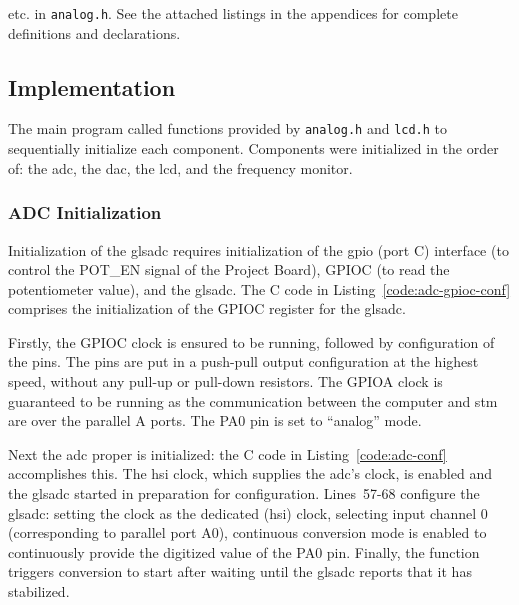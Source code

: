 etc. in \lstinline{analog.h}. See the attached listings in the
appendices for complete definitions and declarations.

\subsection{Implementation}
The main program called functions provided by \lstinline{analog.h} and
\lstinline{lcd.h} to sequentially initialize each component. Components
were initialized in the order of: the \gls{adc}, the \gls{dac}, the
\gls{lcd}, and the frequency monitor. 


\subsubsection{ADC Initialization}
Initialization of the gls{adc} requires initialization of the \gls{gpio}
(port C) interface (to control the POT\_EN signal of the Project Board),
GPIOC (to read the potentiometer value), and the gls{adc}. The C code in
Listing~\ref{code:adc-gpioc-conf} comprises the initialization of the
GPIOC register for the gls{adc}.


Firstly, the GPIOC clock is ensured to be running, followed by
configuration of the pins. The pins are put in a push-pull output
configuration at the highest speed, without any pull-up or pull-down
resistors. The GPIOA clock is guaranteed to be running as the
communication between the computer and \gls{stm} are over the parallel
A ports. The PA0 pin is set to ``analog'' mode. \\


Next the \gls{adc} proper is initialized: the C code in
Listing~\ref{code:adc-conf} accomplishes this.  The \gls{hsi} clock, which
supplies the \gls{adc}'s clock, is enabled and the gls{adc} started in preparation
for configuration. Lines~57-68 configure the gls{adc}: setting the clock as
the dedicated (\gls{hsi}) clock, selecting input channel 0 (corresponding to
parallel port A0), continuous conversion mode is enabled to continuously
provide the digitized value of the PA0 pin. Finally, the function
triggers conversion to start after waiting until the gls{adc} reports that it
has stabilized.

